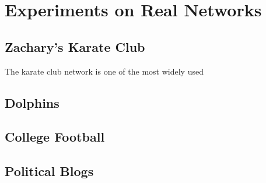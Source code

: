 \chapter{Experiments on Real Networks}



\section{Zachary's Karate Club}

The karate club network is one of the most widely used

\section{Dolphins}


\section{College Football}


\section{Political Blogs}